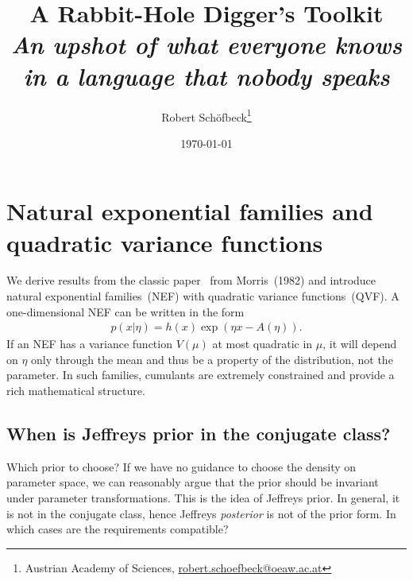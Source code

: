 \documentclass[a4paper,11pt]{article}
\title{A Rabbit-Hole Digger’s Toolkit\\ \small{\emph{An upshot of what everyone knows in a language that nobody speaks}}}
\author{Robert Sch\"ofbeck\thanks{Austrian Academy of Sciences, \href{mailto:robert.schoefbeck@oeaw.ac.at}{robert.schoefbeck@oeaw.ac.at}}}
\date{\today}
\numberwithin{equation}{section}
\theoremstyle{plain}
\theoremstyle{definition}
\theoremstyle{remark}
\newcommand{\1}{\ensuremath{\mathds{1}}\xspace}
\begin{document}
\section{Natural exponential families and quadratic variance functions}
We derive results from the classic paper~\cite{Morris82} from Morris~(1982) and introduce natural exponential families~(NEF) with quadratic variance functions~(QVF). A one-dimensional NEF can be written in the form 
\begin{align}
p(x|\eta)=h(x)\exp(\eta x-A(\eta)).
\end{align}
If an NEF has a variance function $V(\mu)$ at most quadratic in $\mu$, it will depend on $\eta$ only through the mean and thus be a property of the distribution, not the parameter. In such families, cumulants are extremely constrained and provide a rich mathematical structure.

\subsection{When is Jeffreys prior in the conjugate class?}
Which prior to choose? If we have no guidance to choose the density on parameter space, we can reasonably argue that the prior should be invariant under parameter transformations. This is the idea of Jeffreys prior. In general, it is not in the conjugate class, hence Jeffreys \emph{posterior} is not of the prior form. In which cases are the requirements compatible?
\end{document}
